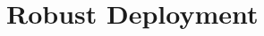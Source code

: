 \documentclass[letterpaper, 10 pt, conference]{ieeeconf}
\begin{document}
\section{Robust Deployment}
\label{sec:sec5}
%
%
%
\end{document}
